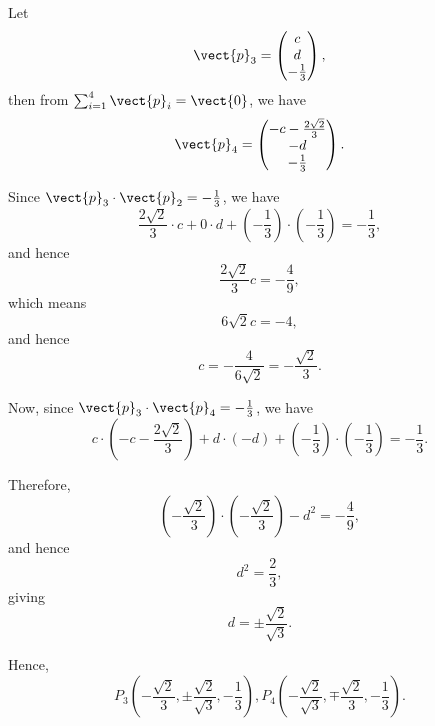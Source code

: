 \begin{enumerate}
          Let
          \[
              \vect{p}_3 = \begin{pmatrix}
                  c \\ d \\ -\frac{1}{3}
              \end{pmatrix},
          \]
          then from \(\sum_{i = 1}^{4} \vect{p}_i = \vect{0}\), we have
          \[
              \vect{p}_4 = \begin{pmatrix}
                  - c - \frac{2\sqrt{2}}{3} \\ -d \\ -\frac{1}{3}
              \end{pmatrix}.
          \]

          Since \(\vect{p}_3 \cdot \vect{p}_2 = -\frac{1}{3}\), we have
          \[
              \frac{2\sqrt{2}}{3} \cdot c + 0 \cdot d + \left(-\frac{1}{3}\right) \cdot \left(-\frac{1}{3}\right) = -\frac{1}{3},
          \]
          and hence
          \[
              \frac{2\sqrt{2}}{3} c = -\frac{4}{9},
          \]
          which means
          \[
              6\sqrt{2} c = -4,
          \]
          and hence
          \[
              c = - \frac{4}{6\sqrt{2}} = - \frac{\sqrt{2}}{3}.
          \]

          Now, since \(\vect{p}_3 \cdot \vect{p}_4 = - \frac{1}{3}\), we have
          \[
              c \cdot \left(- c - \frac{2\sqrt{2}}{3}\right) + d \cdot (-d) + \left(-\frac{1}{3}\right) \cdot \left(-\frac{1}{3}\right) = - \frac{1}{3}.
          \]

          Therefore,
          \[
              \left(-\frac{\sqrt{2}}{3}\right) \cdot \left(- \frac{\sqrt{2}}{3}\right) - d^2 = -\frac{4}{9},
          \]
          and hence
          \[
              d^2 = \frac{2}{3},
          \]
          giving
          \[
              d = \pm \frac{\sqrt{2}}{\sqrt{3}}.
          \]

          Hence,
          \[
              P_3 \left(-\frac{\sqrt{2}}{3}, \pm \frac{\sqrt{2}}{\sqrt{3}}, -\frac{1}{3}\right), P_4 \left(-\frac{\sqrt{2}}{\sqrt{3}}, \mp \frac{\sqrt{2}}{3}, -\frac{1}{3}\right).
          \]


\end{enumerate}
